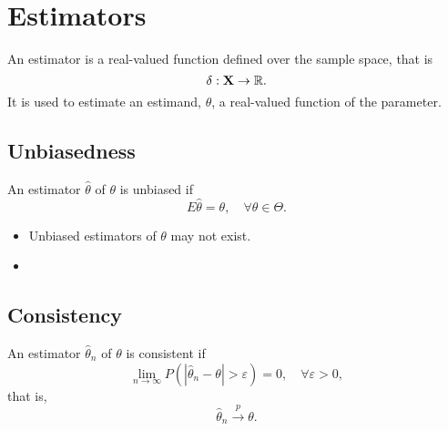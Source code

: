 \section{Estimators}

\begin{definition}[Estimator] \label{def:estimator}
	An estimator is a real-valued function defined over the sample space, that is
	\begin{equation}
		\delta:\textbf{X}\rightarrow{\mathbb R}.
	\end{equation}
	It is used to estimate an estimand, $\theta$, a real-valued function of the parameter.
\end{definition}

\subsection*{Unbiasedness}

\begin{definition}[Unbiasedness]
	An estimator $\hat{\theta}$ of $\theta$ is unbiased if
	\begin{equation}
		E\hat{\theta}=\theta,\quad\forall\theta\in\Theta.
	\end{equation}
\end{definition}

\begin{remark}
	\begin{itemize}
		\item Unbiased estimators of $\theta$ may not exist.
		\item
	\end{itemize}
\end{remark}

\begin{example}

\end{example}

\subsection*{Consistency}

\begin{definition}[Consistency]
	An estimator $\hat{\theta}_n$ of $\theta$ is consistent if
	\begin{equation}
		\lim_{n\rightarrow\infty}P\left(\left|\hat{\theta}_n-\theta\right|>\varepsilon\right)=0,\quad\forall\varepsilon>0,
	\end{equation}
	that is,
	\begin{equation}
		\hat{\theta}_{n}\stackrel{p}{\rightarrow}\theta.
	\end{equation}
\end{definition}

